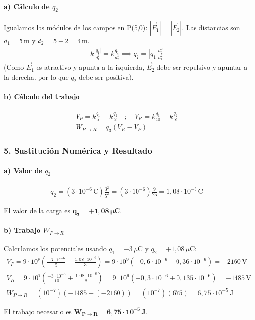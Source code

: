 \paragraph*{a) Cálculo de $q_2$}
Igualamos los módulos de los campos en P(5,0): $|\vec{E}_1| = |\vec{E}_2|$.
Las distancias son $d_1 = 5\,\text{m}$ y $d_2 = 5-2=3\,\text{m}$.
\begin{gather}
    k\frac{|q_1|}{d_1^2} = k\frac{q_2}{d_2^2} \implies q_2 = |q_1|\frac{d_2^2}{d_1^2}
\end{gather}
(Como $\vec{E}_1$ es atractivo y apunta a la izquierda, $\vec{E}_2$ debe ser repulsivo y apuntar a la derecha, por lo que $q_2$ debe ser positiva).
\paragraph*{b) Cálculo del trabajo}
\begin{gather}
    V_P = k\frac{q_1}{5} + k\frac{q_2}{3} \quad ; \quad V_R = k\frac{q_1}{10} + k\frac{q_2}{8} \\
    W_{P \to R} = q_3 (V_R - V_P)
\end{gather}

\subsubsection*{5. Sustitución Numérica y Resultado}
\paragraph*{a) Valor de $q_2$}
\begin{gather}
    q_2 = (3\cdot10^{-6}\,\text{C}) \frac{3^2}{5^2} = (3\cdot10^{-6}) \frac{9}{25} = 1,08\cdot10^{-6}\,\text{C}
\end{gather}
\begin{cajaresultado}
El valor de la carga es $\boldsymbol{q_2 = +1,08\,\mu\textbf{C}}$.
\end{cajaresultado}
\paragraph*{b) Trabajo $W_{P \to R}$}
Calculamos los potenciales usando $q_1=-3\,\mu\text{C}$ y $q_2=+1,08\,\mu\text{C}$:
\begin{gather}
    V_P = 9\cdot10^9 \left( \frac{-3\cdot10^{-6}}{5} + \frac{1,08\cdot10^{-6}}{3} \right) = 9\cdot10^9(-0,6\cdot10^{-6} + 0,36\cdot10^{-6}) = -2160\,\text{V} \\
    V_R = 9\cdot10^9 \left( \frac{-3\cdot10^{-6}}{10} + \frac{1,08\cdot10^{-6}}{8} \right) = 9\cdot10^9(-0,3\cdot10^{-6} + 0,135\cdot10^{-6}) = -1485\,\text{V} \\
    W_{P \to R} = (10^{-7})(-1485 - (-2160)) = (10^{-7})(675) = 6,75\cdot10^{-5}\,\text{J}
\end{gather}
\begin{cajaresultado}
El trabajo necesario es $\boldsymbol{W_{P \to R} = 6,75 \cdot 10^{-5}\,\textbf{J}}$.
\end{cajaresultado}

